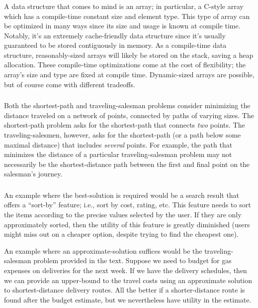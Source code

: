 \documentclass{article}
\begin{document}
\subsubsection{}
    A data structure that comes to mind is an array; in particular, a C-style array which has a compile-time constant size and element type.  This type of array can be optimized in many ways since its size and usage is known at compile time.  Notably, it's an extremely cache-friendly data structure since it's usually guaranteed to be stored contiguously in memory.  As a compile-time data structure, reasonably-sized arrays will likely be stored on the stack, saving a heap allocation.  These compile-time optimizations come at the cost of flexibility; the array's size and type are fixed at compile time.  Dynamic-sized arrays are possible, but of course come with different tradeoffs.

\subsubsection{}
    Both the shortest-path and traveling-salesman problems consider minimizing the distance traveled on a network of points, connected by paths of varying sizes.  The shortest-path problem asks for the shortest-path that connects {\it two} points.  The traveling-salesmen, however, asks for the shortest-path (or a path below some maximal distance) that includes {\it several} points.  For example, the path that minimizes the distance of a particular traveling-salesman problem may not necessarily be the shortest-distance path between the first and final point on the salesman's journey.

\subsubsection{}
    An example where the best-solution is required would be a search result that offers a ``sort-by'' feature; i.e., sort by cost, rating, etc.  This feature needs to sort the items according to the precise values selected by the user.  If they are only approximately sorted, then the utility of this feature is greatly diminished (users might miss out on a cheaper option, despite trying to find the cheapest one).

    An example where an approximate-solution suffices would be the traveling-salesman problem provided in the text.  Suppose we need to budget for gas expenses on deliveries for the next week.  If we have the delivery schedules, then we can provide an upper-bound to the travel costs using an approximate solution to shortest-distance delivery routes.  All the better if a shorter-distance route is found after the budget estimate, but we nevertheless have utility in the estimate.
\end{document}

